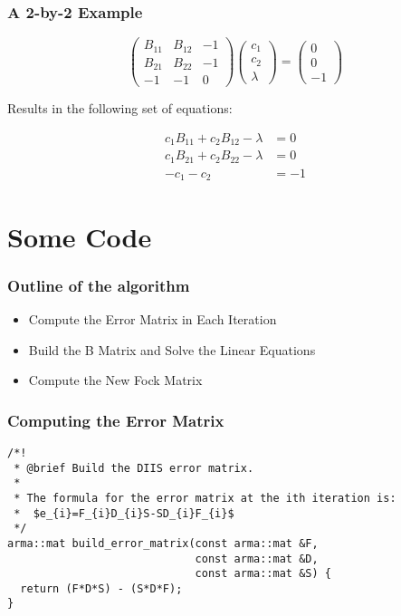 \documentclass[10pt,compress,red]{beamer}
\begin{document}
\begin{frame}
  \frametitle{A 2-by-2 Example}

  \begin{equation}
    \begin{pmatrix}
      B_{11} & B_{12} & -1 \\
      B_{21} & B_{22} & -1 \\
      -1 & -1 & 0
    \end{pmatrix}
    \begin{pmatrix}
      c_{1} \\ c_{2} \\ \lambda
    \end{pmatrix}
    =
    \begin{pmatrix}
      0 \\ 0 \\ -1
    \end{pmatrix}
  \end{equation}

  Results in the following set of equations:

  \begin{align}
    c_{1} B_{11} + c_{2} B_{12} - \lambda &= 0 \\
    c_{1} B_{21} + c_{2} B_{22} - \lambda &= 0 \\
    - c_{1} - c_{2} &= -1
  \end{align}

\end{frame}

\section{Some Code}

\begin{frame}
  \frametitle{Outline of the algorithm}
  \begin{itemize}
    \item Compute the Error Matrix in Each Iteration
    \item Build the B Matrix and Solve the Linear Equations
    \item Compute the New Fock Matrix
  \end{itemize}
\end{frame}

\begin{frame}[fragile]
\frametitle{Computing the Error Matrix}
\begin{verbatim}
/*!
 * @brief Build the DIIS error matrix.
 *
 * The formula for the error matrix at the ith iteration is:
 *  $e_{i}=F_{i}D_{i}S-SD_{i}F_{i}$
 */
arma::mat build_error_matrix(const arma::mat &F,
                             const arma::mat &D,
                             const arma::mat &S) {
  return (F*D*S) - (S*D*F);
}
\end{verbatim}
\end{frame}
\end{document}

